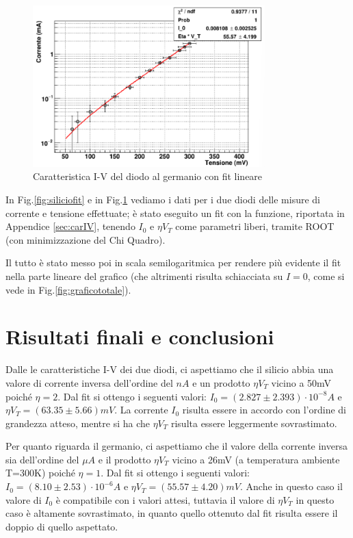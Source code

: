 \documentclass[a4paper, 11pt]{article}
\begin{document}
\begin{figure}[!htb]
    \centering
    \includegraphics[width = 0.8\textwidth]{Immagini - Prima prova/LAB _ Fit germanio.png}
    \caption{Caratteristica I-V del diodo al germanio con fit lineare}
    \label{fig:germaniofit}
\end{figure}

In Fig.\ref{fig:siliciofit} e in Fig.\ref{fig:germaniofit} vediamo i dati per i due diodi delle misure di corrente e tensione effettuate; è stato eseguito un fit con la funzione, riportata in Appendice \ref{sec:carIV}, tenendo $I_0$ e $\eta V_T$ come parametri liberi, tramite ROOT (con minimizzazione del Chi Quadro).

Il tutto è stato messo poi in scala semilogaritmica per rendere più evidente il fit nella parte lineare del grafico (che altrimenti risulta schiacciata su $I = 0$, come si vede in Fig.\ref{fig:graficototale}).

\section{Risultati finali e conclusioni}
Dalle le caratteristiche I-V dei due diodi, ci aspettiamo che il silicio  abbia una valore di corrente inversa dell'ordine del $nA$ e un prodotto $\eta V_T$ vicino a 50mV poiché $\eta = 2 $.  Dal fit si ottengo i seguenti valori: $I_0 = ( 2.827 \pm 2.393) \cdot 10^{-8} A$ e $\eta V_T = (63.35 \pm 5.66) mV  $. La corrente $I_0$ risulta essere in accordo con l'ordine di grandezza atteso, mentre si ha che $\eta V_T$ risulta essere leggermente sovrastimato.

Per quanto riguarda il germanio, ci aspettiamo che il valore della corrente inversa sia dell'ordine del $\mu A$ e il prodotto $\eta V_T$ vicino a 26mV (a temperatura ambiente T=300K) poiché $\eta = 1$. Dal fit si ottengo i seguenti valori: $I_0 = ( 8.10 \pm 2.53) \cdot 10^{-6} A $ e $\eta V_T = ( 55.57 \pm 4.20) mV$. Anche in questo caso il valore di $I_0$ è compatibile con i valori attesi, tuttavia il valore di $\eta V_T$ in questo caso è altamente sovrastimato, in quanto quello ottenuto dal fit risulta essere il doppio di quello aspettato.
\end{document}

